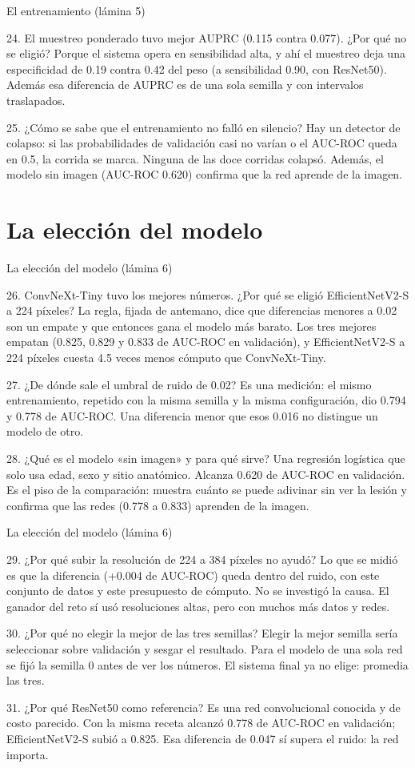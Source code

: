 \documentclass[aspectratio=169,10pt]{beamer}
\newcommand{\qa}[2]{\begin{block}{#1}\footnotesize #2\end{block}}
\begin{document}
\begin{frame}{El entrenamiento (lámina 5)}
  \qa{24. El muestreo ponderado tuvo mejor AUPRC (0.115 contra 0.077). ¿Por qué no se eligió?}{
    Porque el sistema opera en sensibilidad alta, y ahí el muestreo deja una especificidad de 0.19 contra 0.42 del peso (a sensibilidad 0.90, con ResNet50). Además esa diferencia de AUPRC es de una sola semilla y con intervalos traslapados.}
  \qa{25. ¿Cómo se sabe que el entrenamiento no falló en silencio?}{
    Hay un detector de colapso: si las probabilidades de validación casi no varían o el AUC-ROC queda en 0.5, la corrida se marca. Ninguna de las doce corridas colapsó. Además, el modelo sin imagen (AUC-ROC 0.620) confirma que la red aprende de la imagen.}
\end{frame}

\section{La elección del modelo}
\begin{frame}{La elección del modelo (lámina 6)}
  \qa{26. ConvNeXt-Tiny tuvo los mejores números. ¿Por qué se eligió EfficientNetV2-S a 224 píxeles?}{
    La regla, fijada de antemano, dice que diferencias menores a 0.02 son un empate y que entonces gana el modelo más barato. Los tres mejores empatan (0.825, 0.829 y 0.833 de AUC-ROC en validación), y EfficientNetV2-S a 224 píxeles cuesta 4.5 veces menos cómputo que ConvNeXt-Tiny.}
  \qa{27. ¿De dónde sale el umbral de ruido de 0.02?}{
    Es una medición: el mismo entrenamiento, repetido con la misma semilla y la misma configuración, dio 0.794 y 0.778 de AUC-ROC. Una diferencia menor que esos 0.016 no distingue un modelo de otro.}
  \qa{28. ¿Qué es el modelo «sin imagen» y para qué sirve?}{
    Una regresión logística que solo usa edad, sexo y sitio anatómico. Alcanza 0.620 de AUC-ROC en validación. Es el piso de la comparación: muestra cuánto se puede adivinar sin ver la lesión y confirma que las redes (0.778 a 0.833) aprenden de la imagen.}
\end{frame}

\begin{frame}{La elección del modelo (lámina 6)}
  \qa{29. ¿Por qué subir la resolución de 224 a 384 píxeles no ayudó?}{
    Lo que se midió es que la diferencia (+0.004 de AUC-ROC) queda dentro del ruido, con este conjunto de datos y este presupuesto de cómputo. No se investigó la causa. El ganador del reto sí usó resoluciones altas, pero con muchos más datos y redes.}
  \qa{30. ¿Por qué no elegir la mejor de las tres semillas?}{
    Elegir la mejor semilla sería seleccionar sobre validación y sesgar el resultado. Para el modelo de una sola red se fijó la semilla 0 antes de ver los números. El sistema final ya no elige: promedia las tres.}
  \qa{31. ¿Por qué ResNet50 como referencia?}{
    Es una red convolucional conocida y de costo parecido. Con la misma receta alcanzó 0.778 de AUC-ROC en validación; EfficientNetV2-S subió a 0.825. Esa diferencia de 0.047 sí supera el ruido: la red importa.}
\end{frame}
\end{document}
